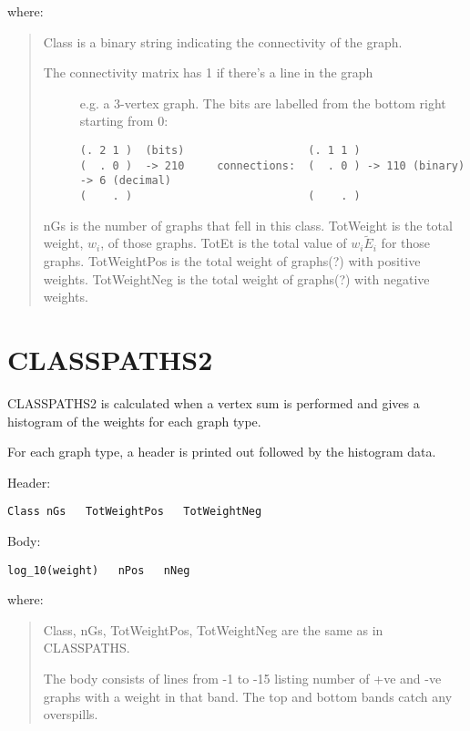 \documentclass[openany,a4paper,10pt]{manual}
\begin{document}
where:
\begin{quote}

Class is a binary string indicating the connectivity of the graph.
\begin{description}
\item[The connectivity matrix has 1 if there's a line in the graph]
e.g. a 3-vertex graph.  The bits are labelled from the bottom right starting from 0:

\begin{Verbatim}[commandchars=@\[\]]
(. 2 1 )  (bits)                   (. 1 1 )
(  . 0 )  -> 210     connections:  (  . 0 ) -> 110 (binary) -> 6 (decimal)
(    . )                           (    . )
\end{Verbatim}

\end{description}

nGs is the number of graphs that fell in this class.
TotWeight is the total weight, $w_i$, of those graphs.
TotEt is the total value of $w_i \tilde{E}_i$ for those graphs.
TotWeightPos is the total weight of graphs(?) with positive weights.
TotWeightNeg is the total weight of graphs(?) with negative weights.
\end{quote}

\resetcurrentobjects


\hypertarget{output-classpaths2}{}\section{CLASSPATHS2}

CLASSPATHS2 is calculated when a vertex sum is performed and gives a histogram of the weights for each graph type.

For each graph type, a header is printed out followed by the histogram data.

Header:

\begin{Verbatim}[commandchars=@\[\]]
Class nGs   TotWeightPos   TotWeightNeg
\end{Verbatim}

Body:

\begin{Verbatim}[commandchars=@\[\]]
log_10(weight)   nPos   nNeg
\end{Verbatim}

where:
\begin{quote}

Class, nGs, TotWeightPos, TotWeightNeg are the same as in CLASSPATHS.

The body consists of lines from -1 to -15 listing number of +ve and -ve graphs
with a weight in that band.  The top and bottom bands catch any overspills.
\end{quote}
\end{document}

